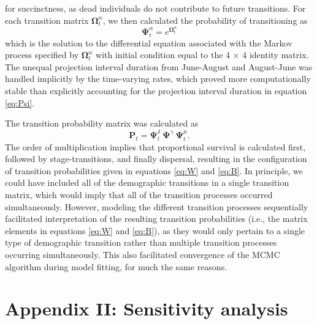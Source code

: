 \documentclass[11pt]{article}
\begin{document}
for succinctness, as dead individuals do not contribute to future transitions.
For each transition matrix $\boldsymbol\Omega^{\alpha}_t$, 
we then calculated the probability of transitioning as
%
\begin{equation} \label{eq:Psi}
\boldsymbol\Psi^{\alpha}_t = e^{\boldsymbol\Omega^{\alpha}_t}
\end{equation}
%
which is the solution to the differential equation associated with the Markov process
specified by $\boldsymbol\Omega^{\alpha}_t$ 
with initial condition equal to the 4 $\times$ 4 identity matrix.
The unequal projection interval duration from June-August and August-June was handled 
implicitly by the time-varying rates, 
which proved more computationally stable than explicitly accounting for the projection
interval duration in equation \ref{eq:Psi}.

The transition probability matrix was calculated as 
\begin{equation} \label{eq:POmega}
\mathbf{P}_{t} = \boldsymbol\Psi^{\delta}_t~\boldsymbol\Psi^{\gamma}~\boldsymbol\Psi^{\mu}_t.
\end{equation}
%
The order of multiplication implies that proportional survival is calculated first,
followed by stage-transitions, and finally dispersal,
resulting in the configuration of transition probabilities
given in equations \ref{eq:W} and \ref{eq:B}.
In principle, we could have included all of the demographic transitions in a single
transition matrix,
which would imply that all of the transition processes occurred simultaneously. 
However, modeling the different transition processes sequentially facilitated interpretation
of the resulting transition probabilities 
(i.e., the matrix elements in equations \ref{eq:W} and \ref{eq:B}), 
as they would only pertain to a single type of demographic transition
rather than multiple transition processes occurring simultaneously.
This also facilitated convergence of the MCMC algorithm during model fitting, 
for much the same reasons.




\section*{Appendix II: Sensitivity analysis} 
\end{document}
